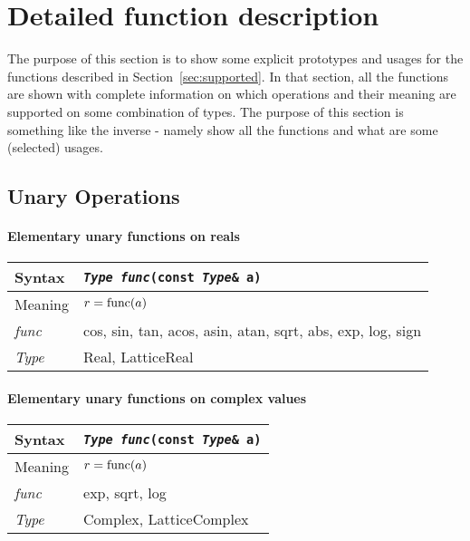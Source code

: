 \documentclass[12pt,letterpaper]{article}
\newcommand{\tLatticeReal}{LatticeReal}
\newcommand{\tLatticeComplex}{LatticeComplex}
\newcommand{\tReal}{Real}
\newcommand{\tComplex}{Complex}
\newcommand{\itt}{\it Type}
\newcommand{\protoUnary}{{\tt {\it Type func}(const {\it Type}\& a)}}
\begin{document}
\section{Detailed function description}
\label{sec:details}

The purpose of this section is to show some explicit prototypes and
usages for the functions described in Section~\ref{sec:supported}.
In that section, all the functions are shown with complete information
on which operations and their meaning are supported on some combination
of types. The purpose of this section is something like the inverse -
namely show all the functions and what are some (selected) usages.

\subsection{Unary Operations}

\paragraph{Elementary unary functions on reals}

\begin{flushleft}
  \begin{tabular}{|l|l|}
  \hline
  Syntax      & \protoUnary  \\
  \hline
  Meaning     & $r = {\rm func}(a)$ \\
  \hline
  {\it func}  & cos, sin, tan, acos, asin, atan,
		sqrt, abs, exp, log, sign \\
  \hline
  \itt        & \tReal, \tLatticeReal \\
  \hline
  \end{tabular}
\end{flushleft}


\paragraph{Elementary unary functions on complex values}

\begin{flushleft}
  \begin{tabular}{|l|l|}
  \hline
  Syntax      & \protoUnary  \\
  \hline
  Meaning     & $r = {\rm func}(a)$ \\
  \hline
  {\it func}  & exp, sqrt, log \\
  \hline
  \itt        & \tComplex, \tLatticeComplex \\
  \hline
  \end{tabular}
\end{flushleft}
\end{document}
